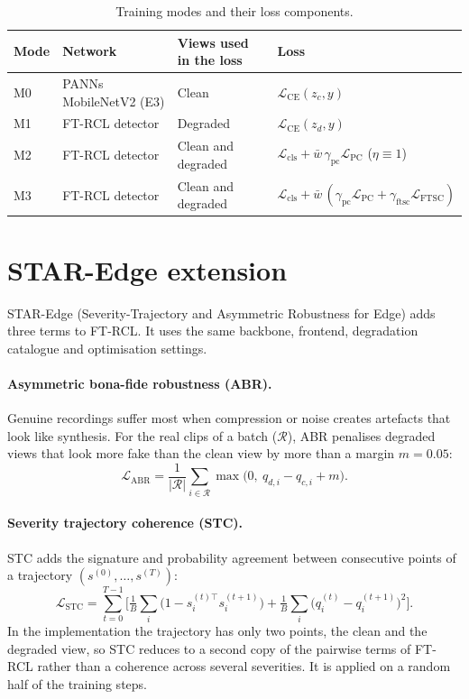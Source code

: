 \documentclass[12pt,a4paper]{report}
\begin{document}
\begin{table}[htbp]
\centering
\caption{Training modes and their loss components.}
\label{tab:modes}
\small
\renewcommand{\arraystretch}{1.2}
\begin{tabular}{@{}llll@{}}
\toprule
Mode & Network & Views used in the loss & Loss \\
\midrule
M0 & PANNs MobileNetV2 (E3) & Clean & $\mathcal{L}_{\mathrm{CE}}(z_c,y)$ \\
M1 & FT-RCL detector & Degraded & $\mathcal{L}_{\mathrm{CE}}(z_d,y)$ \\
M2 & FT-RCL detector & Clean and degraded & $\mathcal{L}_{\mathrm{cls}} + \bar{w}\,\gamma_{\mathrm{pc}}\mathcal{L}_{\mathrm{PC}}$ ($\eta\equiv 1$) \\
M3 & FT-RCL detector & Clean and degraded & $\mathcal{L}_{\mathrm{cls}} + \bar{w}\,(\gamma_{\mathrm{pc}}\mathcal{L}_{\mathrm{PC}} + \gamma_{\mathrm{ftsc}}\mathcal{L}_{\mathrm{FTSC}})$ \\
\bottomrule
\end{tabular}
\end{table}

\section{STAR-Edge extension}
\label{sec:star-edge-method}

STAR-Edge (Severity-Trajectory and Asymmetric Robustness for Edge) adds three terms to FT-RCL. It uses the same backbone, frontend, degradation catalogue and optimisation settings.

\paragraph{Asymmetric bona-fide robustness (ABR).} Genuine recordings suffer most when compression or noise creates artefacts that look like synthesis. For the real clips of a batch ($\mathcal{R}$), ABR penalises degraded views that look more fake than the clean view by more than a margin $m=0.05$:
\begin{equation}
\mathcal{L}_{\mathrm{ABR}} = \frac{1}{|\mathcal{R}|}\sum_{i\in\mathcal{R}} \max\big(0,\ q_{d,i}-q_{c,i}+m\big).
\label{eq:abr}
\end{equation}

\paragraph{Severity trajectory coherence (STC).} STC adds the signature and probability agreement between consecutive points of a trajectory $(s^{(0)},\ldots,s^{(T)})$:
\begin{equation}
\mathcal{L}_{\mathrm{STC}} = \sum_{t=0}^{T-1}\Big[\tfrac{1}{B}\sum_i\big(1-s^{(t)\top}_i s^{(t+1)}_i\big) + \tfrac{1}{B}\sum_i\big(q^{(t)}_i-q^{(t+1)}_i\big)^2\Big].
\label{eq:stc}
\end{equation}
In the implementation the trajectory has only two points, the clean and the degraded view, so STC reduces to a second copy of the pairwise terms of FT-RCL rather than a coherence across several severities. It is applied on a random half of the training steps.
\end{document}
